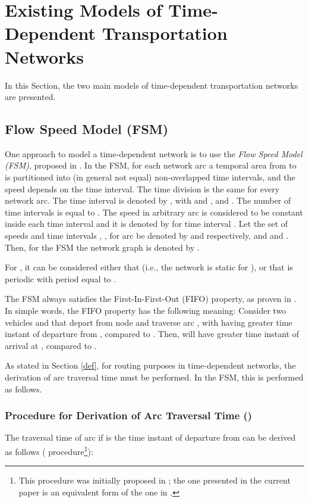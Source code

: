 \documentclass[conference]{IEEEtran}
\begin{document}
\section{Existing Models of Time-Dependent Transportation Networks} \label{models}

In this Section, the two main models of time-dependent transportation networks are presented.


\subsection{Flow Speed Model (FSM)} \label{fsm}

One approach to model a time-dependent network is to use the \emph{Flow Speed Model (FSM)}, proposed in \cite{Sung}. In the FSM, for each network arc a temporal area from  to  is partitioned into (in general not equal) non-overlapped time intervals, and the speed depends on the time interval. The time division is the same for every network arc. The  time interval is denoted by , with   and ,  and . The number of time intervals is equal to .  The speed in arbitrary arc  is considered to be constant inside each time interval and it is denoted by  for time interval . Let the set of speeds  and time intervals , , for arc  be denoted by  and  respectively, and  and . Then, for the FSM the network graph is denoted by  . 

For , it can be considered either that  (i.e., the network is static for ), or  that  is periodic with period equal to .


The FSM always satisfies the First-In-First-Out (FIFO) property, as proven in \cite{Sung}. In simple words, the FIFO property has the following meaning: Consider two vehicles  and  that depart from node  and traverse arc , with  having greater time instant of departure from , compared to . Then,  will have greater time instant of arrival at ,  compared to .

As stated in Section \ref{def}, for routing purposes in time-dependent networks, the derivation of arc traversal time must be performed. In the FSM, this is performed as follows. 

\subsubsection{Procedure for Derivation of Arc Traversal Time ()} \label{Derivation}
The traversal time  of arc  if  is the time instant of departure from  can be derived as follows ( procedure\footnote{This procedure was initially proposed in \cite{Sung}; the one presented in the current paper is an equivalent form of the one in \cite{Sung}.}):
\end{document}
